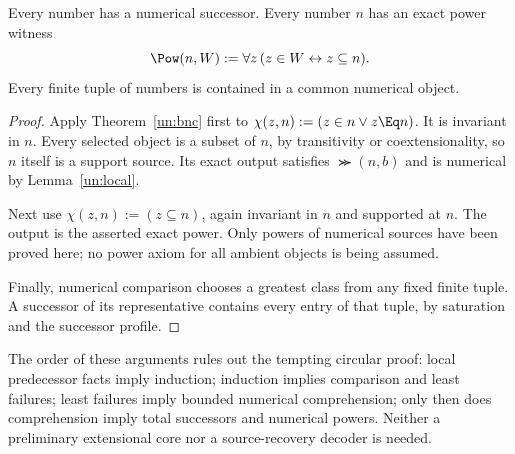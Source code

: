 \begin{corollary}\label{un:bootstrap}
Every number has a numerical successor. Every number $n$ has an exact
power witness
\[
             \Pow(n,W):=\forall z\,(z\in W\leftrightarrow z\subseteq n).
\]
Every finite tuple of numbers is contained in a common numerical object.
\end{corollary}
\begin{proof}
Apply Theorem~\ref{un:bnc} first to
$\chi(z,n):=(z\in n\lor z\Eq n)$. It is invariant in $n$.
Every selected object is a subset of $n$, by transitivity or
coextensionality, so $n$ itself is a support source. Its exact output
satisfies $\Succ(n,b)$ and is numerical by Lemma~\ref{un:local}.

Next use $\chi(z,n):=(z\subseteq n)$, again invariant in $n$ and
supported at $n$. The output is the asserted exact power. Only powers
of numerical sources have been proved here; no power axiom for all
ambient objects is being assumed.

Finally, numerical comparison chooses a greatest class from any fixed
finite tuple. A successor of its representative contains every entry
of that tuple, by saturation and the successor profile.
\end{proof}

The order of these arguments rules out the tempting circular proof:
local predecessor facts imply induction; induction implies comparison
and least failures; least failures imply bounded numerical comprehension;
only then does comprehension imply total successors and numerical
powers. Neither a preliminary extensional core nor a source-recovery
decoder is needed.

